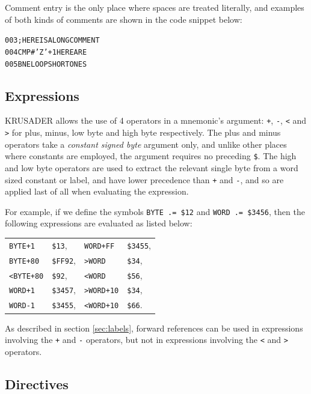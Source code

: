 \documentclass[12pt]{article}
\newcommand{\krusader}{\textsf{KRUSADER}\xspace}
\begin{document}
Comment entry is the only place where spaces are treated literally, and examples
of both kinds of comments are shown in the code snippet below:
\begin{alltt}
003 ;      HERE IS A LONG COMMENT
004        CMP #'Z'+1         HERE ARE
005        BNE LOOP           SHORT ONES
\end{alltt}

\subsection{Expressions}
\label{sec:expressions} 

\krusader allows the use of 4 operators in a mnemonic's argument: \texttt{+}, \texttt{-}, 
\texttt{<} and \texttt{>} for plus, minus, low byte and high byte respectively.  The plus and minus operators take a \emph{constant signed byte} argument only, and unlike other
places where constants are employed, the argument requires no preceding \texttt{\$}.
The high and low byte operators are used to extract the relevant single byte from a word sized
constant or label, and have lower precedence than \texttt{+} and \texttt{-}, and so are applied last of all when evaluating the expression.

For example, if we define the symbols 
\texttt{BYTE .= \$12} and \texttt{WORD .= \$3456},
then the following expressions are evaluated as listed below:

\begin{center}
\begin{tabular}{@{$\bullet$~~}l@{~~=~~}l@{\phantom{WWWWWWW}$\bullet$~~}l@{~~=~~}l}
	\texttt{BYTE+1} & \texttt{\$13}, 		& \texttt{WORD+FF} & \texttt{\$3455}, \tabularnewline
	\texttt{BYTE+80} & \texttt{\$FF92}, & \texttt{>WORD} & \texttt{\$34}, 		\tabularnewline
	\texttt{<BYTE+80} & \texttt{\$92},  & \texttt{<WORD} & \texttt{\$56},			\tabularnewline
	\texttt{WORD+1} & \texttt{\$3457},  & \texttt{>WORD+10} & \texttt{\$34},	\tabularnewline
	\texttt{WORD-1} & \texttt{\$3455},  & \texttt{<WORD+10} & \texttt{\$66}.
\end{tabular}
\end{center}

As described in section \ref{sec:labels}, forward references can be used in expressions involving the \texttt{+} and \texttt{-} operators, but not in expressions involving the  \texttt{<} and \texttt{>} operators.

\subsection{Directives}
\label{sec:directives}
\end{document}
